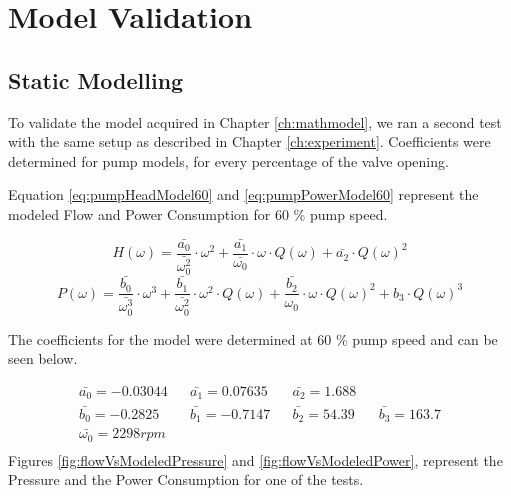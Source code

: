 \chapter{Model Validation}\label{ch:modValPerf}
\section{Static Modelling}
To validate the model acquired in Chapter \ref{ch:mathmodel}, we ran a second test with the 
same setup as described in Chapter \ref{ch:experiment}. Coefficients were determined for pump models,
for every percentage of the valve opening.

Equation \ref{eq:pumpHeadModel60} and \ref{eq:pumpPowerModel60} represent the modeled Flow and Power 
Consumption for 60 \% pump speed.

\begin{equation}
	H(\omega) = \frac{\bar{a_0}}{\bar{\omega_0^2}} \cdot \omega^2 + \frac{\bar{a_1}}{\bar{\omega_0}} \cdot \omega \cdot Q(\omega) + \bar{a_2} \cdot Q(\omega)^2
	\label{eq:pumpHeadModel60}
\end{equation}
\begin{equation}
	P(\omega) = \frac{\bar{b_0}}{\bar{\omega_0^3}} \cdot \omega^3 + \frac{\bar{b_1}}{\bar{\omega_0^2}} \cdot \omega^2 \cdot Q(\omega) + \frac{\bar{b_2}}{\omega_0} \cdot \omega \cdot Q(\omega)^2 + b_3 \cdot Q(\omega)^3
	\label{eq:pumpPowerModel60}
\end{equation}

The coefficients for the model were determined at 60 \% pump speed and can be seen below.

\begin{align*}
	\bar{a_0} = -0.03044 && \bar{a_1} = 0.07635  && \bar{a_2} = 1.688  \\
	\bar{b_0} = -0.2825 && \bar{b_1} = -0.7147 && \bar{b_2} = 54.39 && \bar{b_3} = 163.7 \\
	\bar{\omega_0} = 2298 rpm \\
\end{align*}
\newpage
Figures \ref{fig:flowVsModeledPressure} and \ref{fig:flowVsModeledPower}, represent the Pressure and 
the Power Consumption for one of the tests.

